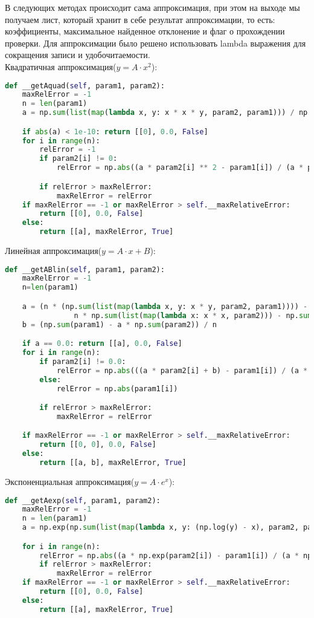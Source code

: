     В следующих методах происходит сама аппроксимация, при этом на выходе мы получаем лист, который хранит в себе результат аппроксимации, то есть: коэффициенты, максимальное найденное отклонение и флаг о прохождении проверки. Для аппроксимации было решено использовать lambda выражения для сокращения записи и удобочитаемости.\\
    
    Квадратичная аппроксимация($y=A\cdot x^2$):
    \begin{lstlisting}[language=Python]
def __getAquad(self, param1, param2):
    maxRelError = -1
    n = len(param1)
    a = np.sum(list(map(lambda x, y: x * x * y, param2, param1))) / np.sum(list(map(lambda x: x ** 4, param2)))

    if abs(a) < 1e-10: return [[0], 0.0, False]
    for i in range(n):
        relError = -1
        if param2[i] != 0:
            relError = np.abs((a * param2[i] ** 2 - param1[i]) / (a * param2[i] ** 2))

        if relError > maxRelError:
            maxRelError = relError
    if maxRelError == -1 or maxRelError > self.__maxRelativeError:
        return [[0], 0.0, False]
    else:
        return [[a], maxRelError, True]
    \end{lstlisting}

    Линейная аппроксимация($ y=A\cdot x + B$):
    \begin{lstlisting}[language=Python]
def __getABlin(self, param1, param2):
    maxRelError = -1
    n=len(param1)

    a = (n * (np.sum(list(map(lambda x, y: x * y, param2, param1)))) - np.sum(param1) * np.sum(param2)) / (
                n * np.sum(list(map(lambda x: x * x, param2))) - np.sum(param2) ** 2)
    b = (np.sum(param1) - a * np.sum(param2)) / n

    if a == 0.0: return [[a], 0.0, False]
    for i in range(n):
        if param2[i] != 0.0:
            relError = np.abs(((a * param2[i] + b) - param1[i]) / (a * param2[i] + b))
        else:
            relError = np.abs(param1[i])

        if relError > maxRelError:
            maxRelError = relError

    if maxRelError == -1 or maxRelError > self.__maxRelativeError:
        return [[0, 0], 0.0, False]
    else:
        return [[a, b], maxRelError, True]
    \end{lstlisting}
\newpage
    Экспоненциальная аппроксимация($y=A\cdot e^x$):
    \begin{lstlisting}[language=Python]
def __getAexp(self, param1, param2):
    maxRelError = -1
    n = len(param1)
    a = np.exp(np.sum(list(map(lambda x, y: (np.log(y) - x), param2, param1))) / n)

    for i in range(n):
        relError = np.abs((a * np.exp(param2[i]) - param1[i]) / (a * np.exp(param2[i])))
        if relError > maxRelError:
            maxRelError = relError
    if maxRelError == -1 or maxRelError > self.__maxRelativeError:
        return [[0], 0.0, False]
    else:
        return [[a], maxRelError, True]
    \end{lstlisting}

